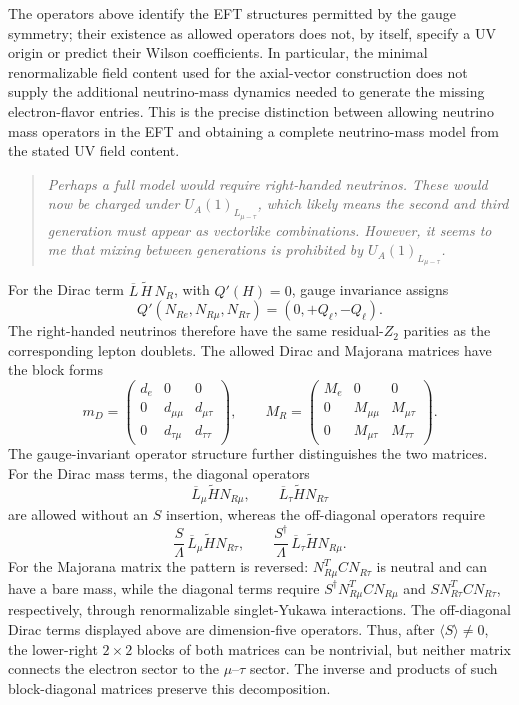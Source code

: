 \documentclass[12pt,a4paper]{article}
\begin{document}
The operators above identify the EFT structures permitted by the gauge symmetry; their existence as allowed operators does not, by itself, specify a UV origin or predict their Wilson coefficients. In particular, the minimal renormalizable field content used for the axial-vector construction does not supply the additional neutrino-mass dynamics needed to generate the missing electron-flavor entries. This is the precise distinction between allowing neutrino mass operators in the EFT and obtaining a complete neutrino-mass model from the stated UV field content.

\medskip
{}

\begin{quote}\itshape
Perhaps a full model would require right-handed neutrinos. These would now be charged under \(U_A(1)_{L_{\mu-\tau}}\), which likely means the second and third generation must appear as vectorlike combinations. However, it seems to me that mixing between generations is prohibited by \(U_A(1)_{L_{\mu-\tau}}\).
\end{quote}

For the Dirac term \(\overline L\,\widetilde H\,N_R\), with \(Q'(H)=0\), gauge invariance assigns
\[
Q'(N_{Re},N_{R\mu},N_{R\tau})=(0,+Q_\ell,-Q_\ell).
\]
The right-handed neutrinos therefore have the same residual-\(Z_2\) parities as the corresponding lepton doublets. The allowed Dirac and Majorana matrices have the block forms
\[
m_D=\begin{pmatrix}d_e&0&0\\0&d_{\mu\mu}&d_{\mu\tau}\\0&d_{\tau\mu}&d_{\tau\tau}\end{pmatrix},
\qquad
M_R=\begin{pmatrix}M_e&0&0\\0&M_{\mu\mu}&M_{\mu\tau}\\0&M_{\mu\tau}&M_{\tau\tau}\end{pmatrix}.
\]
The gauge-invariant operator structure further distinguishes the two matrices. For the Dirac mass terms, the diagonal operators
\[
\overline L_\mu\widetilde H N_{R\mu},\qquad
\overline L_\tau\widetilde H N_{R\tau}
\]
are allowed without an \(S\) insertion, whereas the off-diagonal operators require
\[
\frac{S}{\Lambda}\,\overline L_\mu\widetilde H N_{R\tau},
\qquad
\frac{S^\dagger}{\Lambda}\,\overline L_\tau\widetilde H N_{R\mu}.
\]
For the Majorana matrix the pattern is reversed: \(N_{R\mu}^T C N_{R\tau}\) is neutral and can have a bare mass, while the diagonal terms require \(S^\dagger N_{R\mu}^T C N_{R\mu}\) and \(S N_{R\tau}^T C N_{R\tau}\), respectively, through renormalizable singlet-Yukawa interactions. The off-diagonal Dirac terms displayed above are dimension-five operators. Thus, after \(\langle S\rangle\neq0\), the lower-right \(2\times2\) blocks of both matrices can be nontrivial, but neither matrix connects the electron sector to the \(\mu\)--\(\tau\) sector. The inverse and products of such block-diagonal matrices preserve this decomposition.
\end{document}
